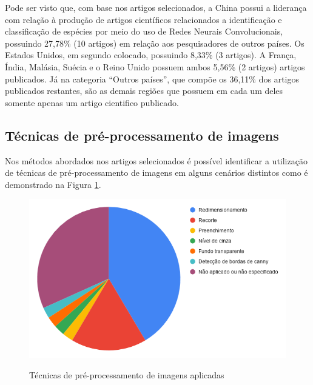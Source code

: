 \documentclass[
	12pt,				%
	oneside,			%
	a4paper,			%
	english,			%
	brazil				%
	]{abntex2ppgsi}
\begin{document}
Pode ser visto que, com base nos artigos selecionados, a China possui a liderança com relação à produção de artigos científicos relacionados a identificação e classificação de espécies por meio do uso de Redes Neurais Convolucionais, possuindo 27,78\% (10 artigos) em relação aos pesquisadores de outros países. Os Estados Unidos, em segundo colocado, possuindo 8,33\% (3 artigos). A França, Índia, Malásia, Suécia e o Reino Unido possuem ambos 5,56\% (2 artigos) artigos publicados. Já na categoria ``Outros países'', que compõe os 36,11\% dos artigos publicados restantes, são as demais regiões que possuem em cada um deles somente apenas um artigo cientifico publicado.

\subsection{Técnicas de pré-processamento de imagens}

Nos métodos abordados nos artigos selecionados é possível identificar a utilização de técnicas de pré-processamento de imagens em alguns cenários distintos como é demonstrado na Figura \ref{fig:grafico_preprocessamento_vs_uso}.

\begin{figure}[H]
    \centering
    \caption{Técnicas de pré-processamento de imagens aplicadas}
    \includegraphics[scale=.60]{imagens/grafico_preprocessamento_vs_uso.png}
    \label{fig:grafico_preprocessamento_vs_uso}
\end{figure}
\end{document}
